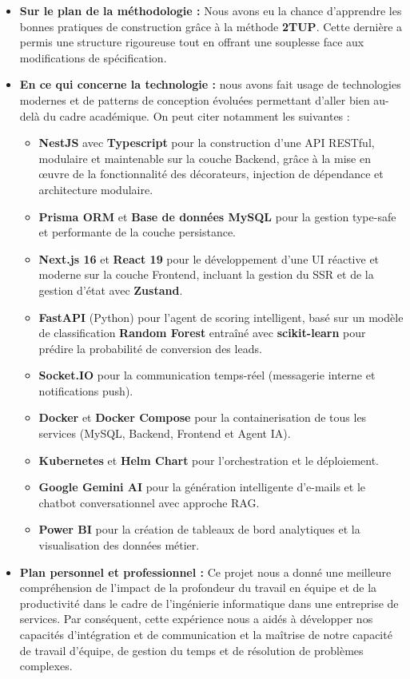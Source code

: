 \begin{itemize}
    \item \textbf{Sur le plan de la méthodologie :} Nous avons eu la chance d'apprendre les bonnes pratiques de construction grâce à la méthode \textbf{2TUP}. Cette dernière a permis une structure rigoureuse tout en offrant une souplesse face aux modifications de spécification.

    \item \textbf{En ce qui concerne la technologie :} nous avons fait usage de technologies modernes et de patterns de conception évoluées permettant d'aller bien au-delà du cadre académique. On peut citer notamment les suivantes :
    \begin{itemize}
        \item \textbf{NestJS} avec \textbf{Typescript} pour la construction d'une API RESTful, modulaire et maintenable sur la couche Backend, grâce à la mise en œuvre de la fonctionnalité des décorateurs, injection de dépendance et architecture modulaire.
        \item \textbf{Prisma ORM} et \textbf{Base de données MySQL} pour la gestion type-safe et performante de la couche persistance.
        \item \textbf{Next.js 16} et \textbf{React 19} pour le développement d'une UI réactive et moderne sur la couche Frontend, incluant la gestion du SSR et de la gestion d'état avec \textbf{Zustand}.
        \item \textbf{FastAPI} (Python) pour l'agent de scoring intelligent, basé sur un modèle de classification \textbf{Random Forest} entraîné avec \textbf{scikit-learn} pour prédire la probabilité de conversion des leads.
        \item \textbf{Socket.IO} pour la communication temps-réel (messagerie interne et notifications push).
        \item \textbf{Docker} et \textbf{Docker Compose} pour la containerisation de tous les services (MySQL, Backend, Frontend et Agent IA).
        \item \textbf{Kubernetes} et \textbf{Helm Chart} pour l'orchestration et le déploiement.
        \item \textbf{Google Gemini AI} pour la génération intelligente d'e-mails et le chatbot conversationnel avec approche RAG.
        \item \textbf{Power BI} pour la création de tableaux de bord analytiques et la visualisation des données métier.
    \end{itemize}
    
    \item \textbf{Plan personnel et professionnel :} Ce projet nous a donné une meilleure compréhension de l'impact de la profondeur du travail en équipe et de la productivité dans le cadre de l'ingénierie informatique dans une entreprise de services. Par conséquent, cette expérience nous a aidés à développer nos capacités d'intégration et de communication et la maîtrise de notre capacité de travail d'équipe, de gestion du temps et de résolution de problèmes complexes.
\end{itemize}

